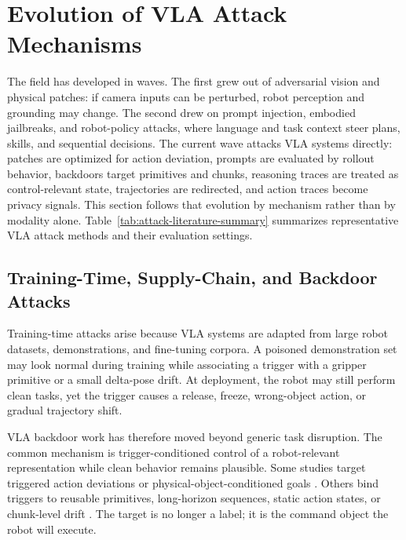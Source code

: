 \section{Evolution of VLA Attack Mechanisms}
\label{sec:evidence-synthesis}

The field has developed in waves. The first grew out of adversarial vision and physical patches: if camera inputs can be perturbed, robot perception and grounding may change. The second drew on prompt injection, embodied jailbreaks, and robot-policy attacks, where language and task context steer plans, skills, and sequential decisions. The current wave attacks VLA systems directly: patches are optimized for action deviation, prompts are evaluated by rollout behavior, backdoors target primitives and chunks, reasoning traces are treated as control-relevant state, trajectories are redirected, and action traces become privacy signals. This section follows that evolution by mechanism rather than by modality alone. Table~\ref{tab:attack-literature-summary} summarizes representative VLA attack methods and their evaluation settings.



\subsection{Training-Time, Supply-Chain, and Backdoor Attacks}

Training-time attacks arise because VLA systems are adapted from large robot datasets, demonstrations, and fine-tuning corpora. A poisoned demonstration set may look normal during training while associating a trigger with a gripper primitive or a small delta-pose drift. At deployment, the robot may still perform clean tasks, yet the trigger causes a release, freeze, wrong-object action, or gradual trajectory shift.

VLA backdoor work has therefore moved beyond generic task disruption. The common mechanism is trigger-conditioned control of a robot-relevant representation while clean behavior remains plausible. Some studies target triggered action deviations or physical-object-conditioned goals \cite{zhou2025badvla,zhou2025goba}. Others bind triggers to reusable primitives, long-horizon sequences, static action states, or chunk-level drift \cite{xu2025dropvla,li2025attackvla,wang2025freezevla,xu2026silentdrift}. The target is no longer a label; it is the command object the robot will execute.

